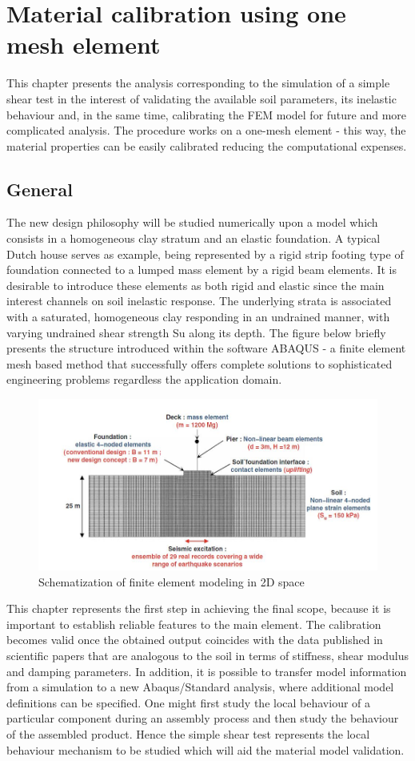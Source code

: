 \documentclass[10pt,a4paper]{report}
\begin{document}
\chapter{Material calibration using one mesh element}
This chapter presents the analysis corresponding to the simulation of a simple shear test in the interest of validating the available soil parameters, its inelastic behaviour and, in the same time, calibrating the FEM model for future and more complicated analysis. The procedure works on a one-mesh element - this way, the material properties can be easily calibrated reducing the computational expenses. 

\section{General}
The new design philosophy will be studied numerically upon a model which consists in a homogeneous clay stratum and an elastic foundation.  A typical Dutch house serves as example, being represented by a rigid strip footing type of foundation connected to a lumped mass element by a rigid beam elements. It is desirable to introduce these elements as both rigid and elastic since the main interest channels on soil inelastic response. The underlying strata is associated with a saturated, homogeneous clay responding in an undrained manner, with varying undrained shear strength Su along its depth. The figure below briefly presents the structure introduced within the software ABAQUS - a finite element mesh based method that successfully offers complete solutions to sophisticated engineering problems regardless the application domain.

\begin{figure}[h!]
	\centering
	\includegraphics[width=0.8\linewidth]{"scheme2D"}
	\caption{Schematization of finite element modeling in 2D space}
	\label{FEM2d}
\end{figure}

This chapter represents the first step in achieving the final scope, because it is important to establish reliable features to the main element. The calibration becomes valid once the obtained output coincides with the data published in scientific papers that are analogous to the soil in terms of stiffness, shear modulus and damping parameters. In addition, it is possible to transfer model information from a simulation to a new Abaqus/Standard analysis, where additional model definitions can be specified. One might first study the local behaviour of a particular component during an assembly process and then study the behaviour of the assembled product. Hence the simple shear test represents the local behaviour mechanism to be studied which will aid the material model validation. 
\end{document}
